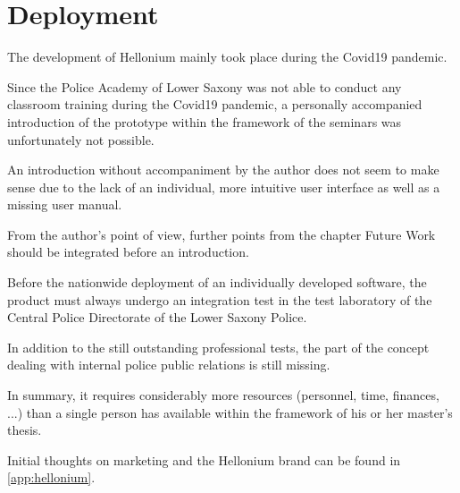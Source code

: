\chapter{Deployment}
\label{chap:deployment}

The development of Hellonium mainly took place during the Covid19 pandemic.

Since the Police Academy of Lower Saxony was not able to conduct any classroom training during the Covid19 pandemic, a personally accompanied introduction of the prototype within the framework of the seminars was unfortunately not possible.

An introduction without accompaniment by the author does not seem to make sense due to the lack of an individual, more intuitive user interface as well as a missing user manual.

From the author's point of view, further points from the chapter Future Work should be integrated before an introduction.

Before the nationwide deployment of an individually developed software, the product must always undergo an integration test in the test laboratory of the Central Police Directorate of the Lower Saxony Police.

In addition to the still outstanding professional tests, the part of the concept dealing with internal police public relations is still missing.

In summary, it requires considerably more resources (personnel, time, finances, ...) than a single person has available within the framework of his or her master's thesis.

Initial thoughts on marketing and the Hellonium brand can be found in \cref{app:hellonium}.